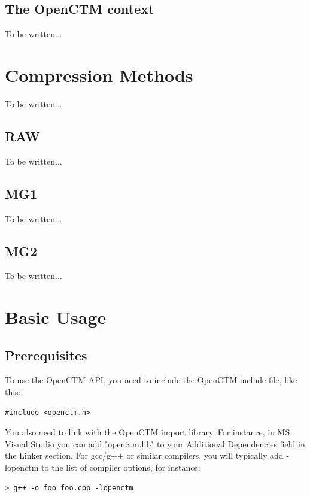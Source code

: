 \section{The OpenCTM context}
To be written...




\chapter{Compression Methods}
To be written...


\section{RAW}
To be written...


\section{MG1}
To be written...


\section{MG2}
To be written...




\chapter{Basic Usage}

\section{Prerequisites}
To use the OpenCTM API, you need to include the OpenCTM include file, like this:

\begin{lstlisting}
#include <openctm.h>
\end{lstlisting}

You also need to link with the OpenCTM import library. For instance, in MS
Visual Studio you can add "openctm.lib" to your Additional Dependencies field
in the Linker section. For gcc/g++ or similar compilers, you will typically
add -lopenctm to the list of compiler options, for instance:

\begin{lstlisting}
> g++ -o foo foo.cpp -lopenctm
\end{lstlisting}


